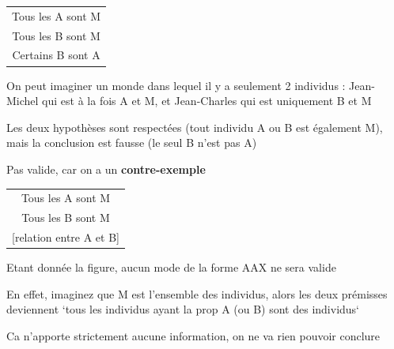 \begin{frame}
	
	\begin{description}[labelindent=6pt,style=multiline,leftmargin=1.3in]
		 \setlength\itemsep{1em}

\item[Mode + figure] \begin{tabular}{c}
Tous les A sont M\\ 
Tous les B sont M\\ 
\cline{1-1}
Certains B sont A
\end{tabular}\pause
\item[Explication] On peut imaginer un monde dans lequel il y a seulement 2 individus : Jean-Michel qui est à la fois A et M, et Jean-Charles qui est uniquement B et M\pause
\item[] Les deux hypothèses sont respectées (tout individu A ou B est également M), mais la conclusion est fausse (le seul B n'est pas A)\pause
\item[Réponse] Pas valide, car on a un \textbf{contre-exemple} 

	\end{description} 
\end{frame}


\begin{frame}
	
	\begin{description}[labelindent=6pt,style=multiline,leftmargin=1.3in]
		 \setlength\itemsep{1em}

\item[AAX + fig. 3] \begin{tabular}{c}
Tous les A sont M\\ 
Tous les B sont M\\ 
\cline{1-1}
[relation entre A et B]
\end{tabular} \pause
\item[Remarque] Etant donnée la figure, aucun mode de la forme AAX ne sera valide
\pause
\item[] En effet, imaginez que M est l'ensemble des individus\pause, alors les deux prémisses deviennent `tous les individus ayant la prop A (ou B) sont des individus`\pause
\item[] Ca n'apporte strictement aucune information, on ne va rien pouvoir conclure

	\end{description} 
\end{frame}






